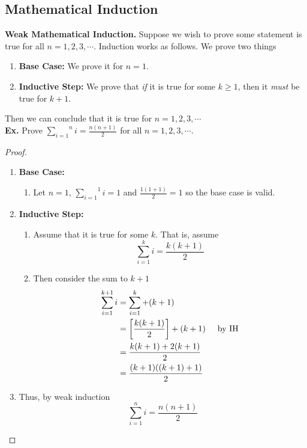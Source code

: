 \documentclass[class=article, crop=false]{standalone}
\def\inlinesum#1#2{\overset{#2}{\underset{#1}{\sum}}}
\begin{document}
\subsection{Mathematical Induction}
\textbf{Weak Mathematical Induction.} Suppose we wish to prove some statement is true for all $n=1,2,3,\cdots$.
Induction works as follows. We prove two things
\begin{enumerate}[1.]
	\item \textbf{Base Case:} We prove it for $n=1$.
	\item \textbf{Inductive Step:} We prove that \emph{if} it is true for some $k\geq 1$, then it \emph{must} be true for $k+1$.
\end{enumerate}
Then we can conclude that it is true for $n=1,2,3,\cdots$\\
\textbf{Ex.} Prove $\inlinesum{i=1}{n}i = \frac{n(n+1)}{2}$ for all $n=1,2,3,\cdots$.
\begin{proof}
	$ $\\
	\begin{enumerate}
		\item[] \textbf{Base Case:} 
			\begin{enumerate}
				\item[] Let $n=1$, $\inlinesum{i=1}{1} i = 1$ and $\frac{1(1+1)}{2}=1$ so the base case is valid.
			\end{enumerate}
		\item[] \textbf{Inductive Step:}
			\begin{enumerate}
				\item[] Assume that it is true for some $k$. That is, assume $$\sum_{i=1}^{k} i = \frac{k(k+1)}{2}$$
				\item[] Then consider the sum to $k+1$
					\begin{align*}
						\sum_{i=1}^{k+1} i &= \sum_{i=1}^{k} + (k+1) \\
						&= \left[\frac{k(k+1)}{2}\right] + (k+1) \hspace{5mm}\text{by IH} \\
						&= \frac{k(k+1) + 2(k+1)}{2} \\
						&= \frac{(k+1)((k+1)+1)}{2}
					\end{align*}
			\end{enumerate}
		\item[] Thus, by weak induction $$\inlinesum{i=1}{n}i = \frac{n(n+1)}{2}$$
	\end{enumerate}
\end{proof}
\end{document}
